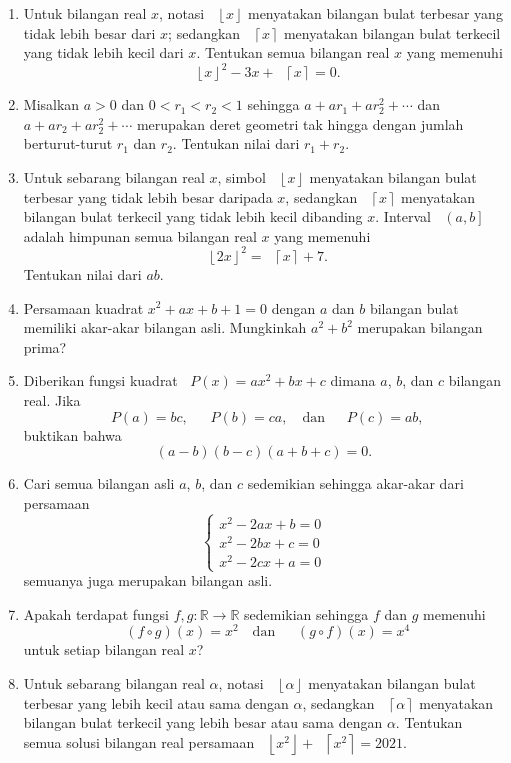 \documentclass[12pt]{article}
\newcommand*\lbrk[1]{\mathop{}\!\left({#1}\right]}
\newcommand*\floor[1]{\mathop{}\!\left\lfloor{#1}\right\rfloor}
\newcommand*\ceil[1]{\mathop{}\!\left\lceil{#1}\right\rceil}
\newcommand*\func[2]{\mathop{}\!{#1}{\left({#2}\right)}}
\begin{document}
\begin{enumerate}[leftmargin=*]
		\item Untuk bilangan real $ x $, notasi $ \floor{x} $ menyatakan bilangan bulat terbesar yang tidak lebih besar dari $ x $; sedangkan $ \ceil{x} $ menyatakan bilangan bulat terkecil yang tidak lebih kecil dari $ x $. Tentukan semua bilangan real $ x $ yang memenuhi
		\[ \floor{x}^{2} - 3x + \ceil{x} = 0. \]
		\item Misalkan $ a > 0 $ dan $ 0 < r_{1} < r_{2} < 1 $ sehingga $ a + ar_{1} + ar_{2}^{2} + \cdots $ dan $ a + ar_{2} + ar_{2}^{2} + \cdots $ merupakan deret geometri tak hingga dengan jumlah berturut-turut $ r_{1} $ dan $ r_{2} $. Tentukan nilai dari $ r_{1} + r_{2} $.
		\item Untuk sebarang bilangan real $ x $, simbol $ \floor{x} $ menyatakan bilangan bulat terbesar yang tidak lebih besar daripada $ x $, sedangkan $ \ceil{x} $ menyatakan bilangan bulat terkecil yang tidak lebih kecil dibanding $ x $. Interval $ \lbrk{a, b} $ adalah himpunan semua bilangan real $ x $ yang memenuhi
		\[ \floor{2x}^{2} = \ceil{x} + 7. \]
		Tentukan nilai dari $ ab $.
		\item Persamaan kuadrat $ x^{2} + ax + b + 1 = 0 $ dengan $ a $ dan $ b $ bilangan bulat memiliki akar-akar bilangan asli. Mungkinkah $ a^{2} + b^{2} $ merupakan bilangan prima?
		\item Diberikan fungsi kuadrat $ \func{P}{x} = ax^{2} + bx + c $ dimana $ a $, $ b $, dan $ c $ bilangan real. Jika
		\[ \func{P}{a} = bc, \quad \func{P}{b} = ca, \quad \mbox{dan} \quad \func{P}{c} = ab, \]
		buktikan bahwa
		\[ \left(a - b\right)\left(b - c\right)\left(a + b + c\right) = 0. \]
		\item Cari semua bilangan asli $ a $, $ b $, dan $ c $ sedemikian sehingga akar-akar dari persamaan
		\[
			\begin{cases}
				x^{2} - 2ax + b = 0 \\
				x^{2} - 2bx + c = 0 \\
				x^{2} - 2cx + a = 0
			\end{cases}
		\]
		semuanya juga merupakan bilangan asli.
		\item Apakah terdapat fungsi $ f, g : \mathbb{R} \to \mathbb{R} $ sedemikian sehingga $ f $ dan $ g $ memenuhi
		\[ \func{\left(f \circ g\right)}{x} = x^{2} \quad \mbox{dan} \quad \func{\left(g \circ f\right)}{x} = x^{4} \]
		untuk setiap bilangan real $ x $?
		\item Untuk sebarang bilangan real $ \alpha $, notasi $ \floor{\alpha} $ menyatakan bilangan bulat terbesar yang lebih kecil atau sama dengan $ \alpha $, sedangkan $ \ceil{\alpha} $ menyatakan bilangan bulat terkecil yang lebih besar atau sama dengan $ \alpha $. Tentukan semua solusi bilangan real persamaan $ \floor{x^{2}} + \ceil{x^{2}} = 2021 $.

\end{enumerate}
\end{document}
